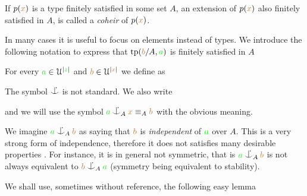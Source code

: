 \documentclass[creche.tex]{subfiles}
\begin{document}
If $p({\color{brown} x})$ is a type finitely satisfied in some set $A$, an extension of $p({\color{brown} x})$ also finitely satisfied in $A$, is called a \emph{coheir\/} of $p({\color{brown} x})$.

In many cases it is useful to focus on elements instead of types.
We introduce the following notation to express that ${\rm tp}({\color{brown} b}/A,{\color{green} a})$ is finitely satisfied in $A$

\begin{definition}\label{def_coheir_idepencence} For every ${\color{green} a}\in\EuScript U^{|{\color{green} z}|}$ and ${\color{brown} b}\in\EuScript U^{|{\color{brown} x}|}$ we define as

\noindent\llap{\textcolor{red}{\Large\danger}\kern1.5ex}%


The symbol $\nonforkc$ is not standard.
We also write


and we will use the symbol \emph{${\gr a}\nonforkc_A{\mr x}\equiv_A{\mr b}$} with the obvious meaning.\QED
\end{definition}

We imagine ${\gr a}\nonforkc_A{\mr b}$ as saying that ${\color{brown} b}$ is \emph{independent\/} of ${\color{green} a}$ over $A$.
This is a very strong form of independence, therefore it does not satisfies many desirable properties .
For instance, it is in general not symmetric, that is ${\gr a}\nonforkc_A{\mr b}$ is not always equivalent to ${\mr b}\nonforkc_A{\gr a}$ (symmetry being equivalent to stability).

We shall use, sometimes without reference, the following easy lemma
\end{document}
